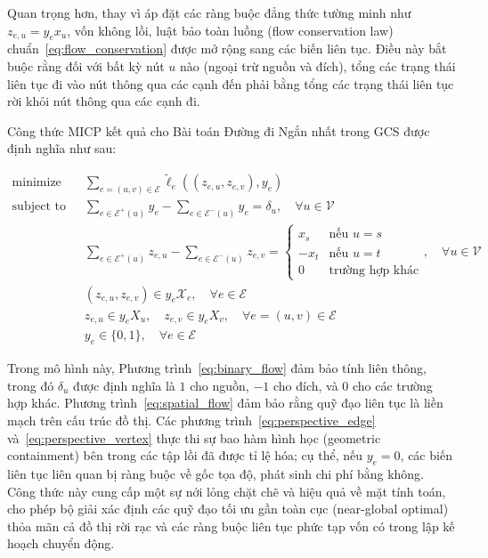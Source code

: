 Quan trọng hơn, thay vì áp đặt các ràng buộc đẳng thức tường minh như $z_{e,u} = y_e x_u$, vốn không lồi, luật bảo toàn luồng (flow conservation law) chuẩn~\eqref{eq:flow_conservation} được mở rộng sang các biến liên tục. Điều này bắt buộc rằng đối với bất kỳ nút $u$ nào (ngoại trừ nguồn và đích), tổng các trạng thái liên tục đi vào nút thông qua các cạnh đến phải bằng tổng các trạng thái liên tục rời khỏi nút thông qua các cạnh đi.

Công thức MICP kết quả cho Bài toán Đường đi Ngắn nhất trong GCS được định nghĩa như sau:

\begin{subequations}
\begin{align}
\text{minimize} \quad & \sum_{e=(u,v) \in \mathcal{E}} \tilde{\ell}_e((z_{e,u}, z_{e,v}), y_e) \label{eq:gcs_obj_perspective} \\
\text{subject to} \quad & \sum_{e \in \mathcal{E}^+(u)} y_e - \sum_{e \in \mathcal{E}^-(u)} y_e = \delta_u, \quad \forall u \in \mathcal{V} \label{eq:binary_flow} \\
& \sum_{e \in \mathcal{E}^+(u)} z_{e,u} - \sum_{e \in \mathcal{E}^-(u)} z_{e,v} = 
\begin{cases}
x_s & \text{nếu } u = s \\
-x_t & \text{nếu } u = t \\
0 & \text{trường hợp khác}
\end{cases}, \quad \forall u \in \mathcal{V} \label{eq:spatial_flow} \\
& (z_{e,u}, z_{e,v}) \in y_e \mathcal{X}_e, \quad \forall e \in \mathcal{E} \label{eq:perspective_edge} \\
& z_{e,u} \in y_e X_u, \quad z_{e,v} \in y_e X_v, \quad \forall e=(u,v) \in \mathcal{E} \label{eq:perspective_vertex} \\
& y_e \in \{0, 1\}, \quad \forall e \in \mathcal{E} \label{eq:binary_constraint}
\end{align}
\end{subequations}

Trong mô hình này, Phương trình~\eqref{eq:binary_flow} đảm bảo tính liên thông, trong đó $\delta_u$ được định nghĩa là $1$ cho nguồn, $-1$ cho đích, và $0$ cho các trường hợp khác. Phương trình~\eqref{eq:spatial_flow} đảm bảo rằng quỹ đạo liên tục là liền mạch trên cấu trúc đồ thị. Các phương trình~\eqref{eq:perspective_edge} và~\eqref{eq:perspective_vertex} thực thi sự bao hàm hình học (geometric containment) bên trong các tập lồi đã được tỉ lệ hóa; cụ thể, nếu $y_e=0$, các biến liên tục liên quan bị ràng buộc về gốc tọa độ, phát sinh chi phí bằng không. Công thức này cung cấp một sự nới lỏng chặt chẽ và hiệu quả về mặt tính toán, cho phép bộ giải xác định các quỹ đạo tối ưu gần toàn cục (near-global optimal) thỏa mãn cả đồ thị rời rạc và các ràng buộc liên tục phức tạp vốn có trong lập kế hoạch chuyển động.

